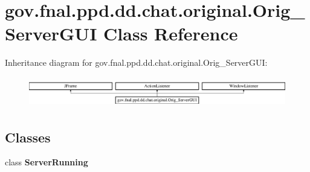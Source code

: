 \hypertarget{classgov_1_1fnal_1_1ppd_1_1dd_1_1chat_1_1original_1_1Orig__ServerGUI}{\section{gov.\-fnal.\-ppd.\-dd.\-chat.\-original.\-Orig\-\_\-\-Server\-G\-U\-I Class Reference}
\label{classgov_1_1fnal_1_1ppd_1_1dd_1_1chat_1_1original_1_1Orig__ServerGUI}
}
Inheritance diagram for gov.\-fnal.\-ppd.\-dd.\-chat.\-original.\-Orig\-\_\-\-Server\-G\-U\-I\-:\begin{figure}[H]
\begin{center}
\leavevmode
\includegraphics[height=1.342926cm]{classgov_1_1fnal_1_1ppd_1_1dd_1_1chat_1_1original_1_1Orig__ServerGUI}
\end{center}
\end{figure}
\subsection*{Classes}
\begin{DoxyCompactItemize}
\item 
class {\bfseries Server\-Running}
\end{DoxyCompactItemize}
